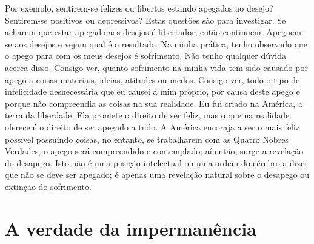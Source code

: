 Por exemplo, sentirem-se felizes ou libertos estando apegados ao desejo? Sentirem-se positivos ou depressivos? Estas
questões são para investigar. Se acharem que estar apegado
aos desejos é libertador, então continuem. Apeguem-se aos
desejos e vejam qual é o resultado.
Na minha prática, tenho observado que o apego para com
os meus desejos é sofrimento. Não tenho qualquer dúvida
acerca disso. Consigo ver, quanto sofrimento na minha vida
tem sido causado por apego a coisas materiais, ideias, atitudes
ou medos. Consigo ver, todo o tipo de infelicidade
desnecessária que eu causei a mim próprio, por causa deste
apego e porque não compreendia as coisas na sua realidade.
Eu fui criado na América, a terra da liberdade. Ela promete o
direito de ser feliz, mas o que na realidade oferece é o direito
de ser apegado a tudo. A América encoraja a ser o mais feliz
possível possuindo coisas, no entanto, se trabalharem com
as Quatro Nobres Verdades, o apego será compreendido e
contemplado; aí então, surge a revelação do desapego. Isto
não é uma posição intelectual ou uma ordem do cérebro a
dizer que não se deve ser apegado; é apenas uma revelação
natural sobre o desapego ou extinção do sofrimento.

\section{A verdade da impermanência}

